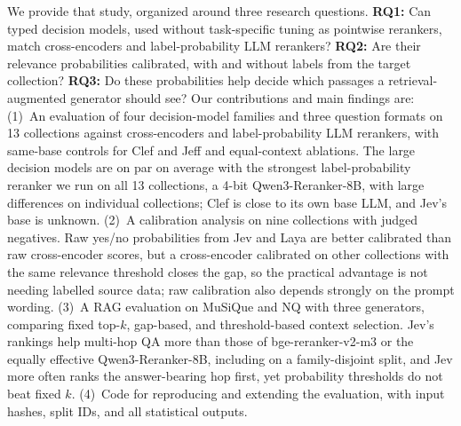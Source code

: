We provide that study, organized around three research questions.
\textbf{RQ1:} Can typed decision models, used without task-specific tuning as pointwise rerankers, match cross-encoders and label-probability LLM rerankers?
\textbf{RQ2:} Are their relevance probabilities calibrated, with and without labels from the target collection?
\textbf{RQ3:} Do these probabilities help decide which passages a retrieval-augmented generator should see?
Our contributions and main findings are:
(1)~An evaluation of four decision-model families and three question formats on 13 collections against cross-encoders and label-probability LLM rerankers, with same-base controls for Clef and Jeff and equal-context ablations. The large decision models are on par on average with the strongest label-probability reranker we run on all 13 collections, a 4-bit Qwen3-Reranker-8B, with large differences on individual collections; Clef is close to its own base LLM, and Jev's base is unknown.
(2)~A calibration analysis on nine collections with judged negatives. Raw yes/no probabilities from Jev and Laya are better calibrated than raw cross-encoder scores, but a cross-encoder calibrated on other collections with the same relevance threshold closes the gap, so the practical advantage is not needing labelled source data; raw calibration also depends strongly on the prompt wording.
(3)~A RAG evaluation on MuSiQue and NQ with three generators, comparing fixed top-$k$, gap-based, and threshold-based context selection. Jev's rankings help multi-hop QA more than those of bge-reranker-v2-m3 or the equally effective Qwen3-Reranker-8B, including on a family-disjoint split, and Jev more often ranks the answer-bearing hop first, yet probability thresholds do not beat fixed $k$.
(4)~Code for reproducing and extending the evaluation, with input hashes, split IDs, and all statistical outputs.
